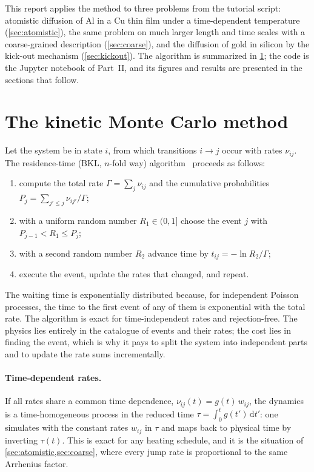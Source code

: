 \documentclass[11pt,a4paper]{article}
\numberwithin{equation}{section}
\theoremstyle{remark}
\begin{document}
This report applies the method to three problems from the tutorial script: atomistic diffusion of Al
in a Cu thin film under a time-dependent temperature (\cref{sec:atomistic}), the same problem on much
larger length and time scales with a coarse-grained description (\cref{sec:coarse}), and the diffusion
of gold in silicon by the kick-out mechanism (\cref{sec:kickout}). The algorithm is summarized in
\cref{sec:kmc}; the code is the Jupyter notebook of Part~II, and its figures and results are presented
in the sections that follow.

\section{The kinetic Monte Carlo method}\label{sec:kmc}

Let the system be in state $i$, from which transitions $i\to j$ occur with rates $\nu_{ij}$. The
residence-time (BKL, $n$-fold way) algorithm~\citep{bortz1975, gillespie1977} proceeds as follows:
\begin{enumerate}\setlength{\itemsep}{1pt}
  \item compute the total rate $\Gamma = \sum_j\nu_{ij}$ and the cumulative probabilities
    $P_j = \sum_{j'\le j}\nu_{ij'}/\Gamma$;
  \item with a uniform random number $R_1\in(0,1]$ choose the event $j$ with $P_{j-1} < R_1 \le P_j$;
  \item with a second random number $R_2$ advance time by $t_{ij} = -\ln R_2/\Gamma$;
  \item execute the event, update the rates that changed, and repeat.
\end{enumerate}
The waiting time is exponentially distributed because, for independent Poisson processes, the time to
the first event of any of them is exponential with the total rate. The algorithm is exact for
time-independent rates and rejection-free. The physics lies entirely in the catalogue of events and
their rates; the cost lies in finding the event, which is why it pays to split the system into
independent parts and to update the rate sums incrementally.

\paragraph{Time-dependent rates.}
If all rates share a common time dependence, $\nu_{ij}(t) = g(t)\,w_{ij}$, the dynamics is a
time-homogeneous process in the reduced time $\tau = \int_0^t g(t')\,\mathrm{d}t'$: one simulates with
the constant rates $w_{ij}$ in $\tau$ and maps back to physical time by inverting $\tau(t)$. This is
exact for any heating schedule, and it is the situation of \cref{sec:atomistic,sec:coarse}, where every
jump rate is proportional to the same Arrhenius factor.
\end{document}
